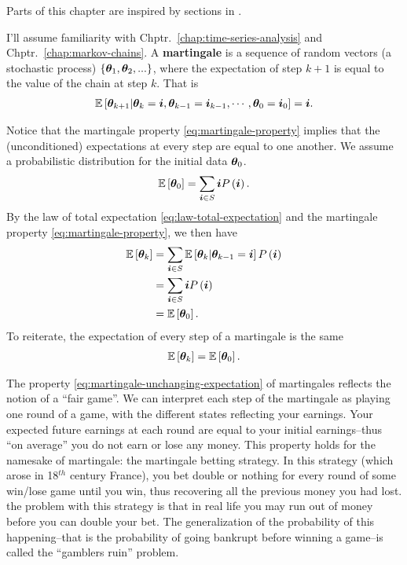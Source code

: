 Parts of this chapter are inspired by sections in \cite{zhou2008practical,feller1968introduction}.

I'll assume familiarity with Chptr.~\ref{chap:time-series-analysis} and Chptr.~\ref{chap:markov-chains}.
A \textbf{martingale} is a sequence of random vectors (a stochastic process) $\left\{{\bm \theta}_1,{\bm \theta}_2,...\right\}$, where the expectation of step $k+1$ is equal to the value of the chain at step $k$.
That is
\begin{align}
    \label{eq:martingale-property}
    \mathbb{E}\left[{\bm \theta}_{k+1}|{\bm \theta}_{k}={\bm i},{\bm \theta}_{k-1}={\bm i}_{k-1},\cdots,{\bm \theta}_0={\bm i}_0\right]
    =
    {\bm i}
    .
\end{align}

Notice that the martingale property \eqref{eq:martingale-property} implies that the (unconditioned) expectations at every step are equal to one another.
We assume a probabilistic distribution for the initial data ${\bm \theta}_0$.
\begin{align}
    \mathbb{E}\left[{\bm \theta}_0\right]
    =
    \sum_{{\bm i}\in S} {\bm i} P\left({\bm i}\right)
    .
\end{align}
By the law of total expectation \eqref{eq:law-total-expectation} and the martingale property \eqref{eq:martingale-property}, we then have
\begin{align}
    \mathbb{E}\left[{\bm \theta}_k\right]
    &=
    \sum_{{\bm i}\in S} \mathbb{E}\left[{\bm \theta}_k|{\bm \theta}_{k-1}={\bm i}\right]P\left({\bm i}\right)
    \nonumber\\
    &=
    \sum_{{\bm i}\in S} {\bm i} P\left({\bm i}\right)
    \nonumber\\
    &=
    \mathbb{E}\left[{\bm \theta}_0\right]
    .
\end{align}
To reiterate, the expectation of every step of a martingale is the same 
\begin{align}
    \label{eq:martingale-unchanging-expectation}
    \mathbb{E}\left[{\bm \theta}_k\right]
    =
    \mathbb{E}\left[{\bm \theta}_0\right]
    .
\end{align}

The property \eqref{eq:martingale-unchanging-expectation} of martingales reflects the notion of a ``fair game''.
We can interpret each step of the martingale as playing one round of a game, with the different states reflecting your earnings.
Your expected future earnings at each round are equal to your initial earnings--thus ``on average'' you do not earn or lose any money. 
This property holds for the namesake of martingale: the martingale betting strategy.
In this strategy (which arose in 18$^{th}$ century France), you bet double or nothing for every round of some win/lose game until you win, thus recovering all the previous money you had lost. 
the problem with this strategy is that in real life you may run out of money before you can double your bet.
The generalization of the probability of this happening--that is the probability of going bankrupt before winning a game--is called the ``gamblers ruin'' problem.

